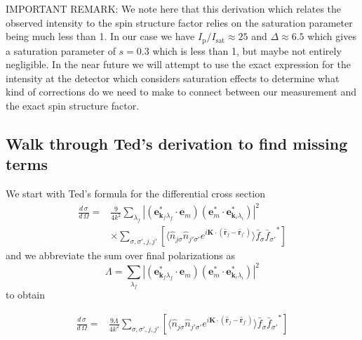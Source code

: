 \documentclass[11pt,letter]{article}
\newcommand{\bv}[1]{\ensuremath{\bm{#1}}}
\newcommand{\dsig}[1]{\ensuremath{ \frac{ d\,\sigma_{#1} }{d\,\Omega} }}
\begin{document}
IMPORTANT REMARK:   We note here that this derivation which relates the
observed intensity to the spin structure factor relies on the saturation
parameter being much less than 1.   In our case we have
$I_{\mathrm{p}}/I_{\mathrm{sat}}\approx 25$ and $\Delta\approx 6.5$ which gives a saturation
parameter of $s=0.3$ which is less than 1, but maybe not entirely negligible.
In the near future we will attempt to use the exact expression for the
intensity at the detector which considers saturation effects to determine what
kind of corrections do we need to make to connect between our measurement and
the exact spin structure factor. 

\subsection{Walk through Ted's derivation to find missing terms}\label{sec:Ted}

We start with Ted's formula for the differential cross section
\begin{equation}
\begin{split}
\dsig{} =& \frac{9}{4k^{2}}
              \sum_{\lambda_{f}} | (\bv{e}_{\bv{k}_{f} \lambda_{f}}^{*} \cdot \bv{e}_{m} )
                                   (\bv{e}_{m}^{*} \cdot \bv{e}_{\bv{k}_{i} \lambda_{i}}^{*} )
                                 |^{2} \\
          & \times \sum_{ \sigma,\sigma', j, j' } [ \langle \hat{n}_{j\sigma}\hat{n}_{j'\sigma'}
              e^{ i \bv{K} \cdot ( \hat{\bv{r}}_{j} - \hat{\bv{r}}_{j'} ) } \rangle
              \bar{f}_{\sigma} {\bar{f}_{\sigma'}}^{*} ]
\end{split}
\end{equation}
and we abbreviate the sum over final polarizations as
\begin{equation}
 \Lambda = \sum_{\lambda_{f}} | (\bv{e}_{\bv{k}_{f} \lambda_{f}}^{*} \cdot \bv{e}_{m} )
                                   (\bv{e}_{m}^{*} \cdot \bv{e}_{\bv{k}_{i} \lambda_{i}}^{*} )
                                 |^{2}
\end{equation}
to obtain

\begin{equation}
\begin{split}
\dsig{} =& \frac{9\Lambda}{4k^{2}}
               \sum_{ \sigma,\sigma', j, j' } [ \langle \hat{n}_{j\sigma}\hat{n}_{j'\sigma'}
              e^{ i \bv{K} \cdot ( \hat{\bv{r}}_{j} - \hat{\bv{r}}_{j'} ) } \rangle
              \bar{f}_{\sigma} {\bar{f}_{\sigma'}}^{*} ] \\
\end{split}
\end{equation}
\end{document}
